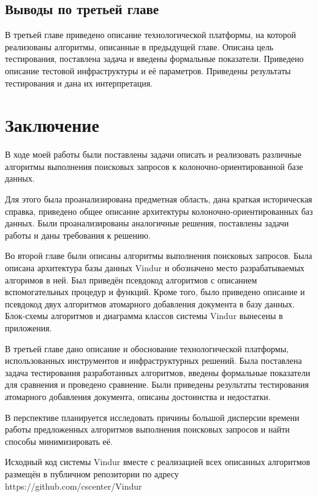 \documentclass{matmex-diploma}
\begin{document}
        \subsection{Выводы по третьей главе}
            В третьей главе приведено описание технологической платформы, на которой реализованы алгоритмы, описанные в предыдущей главе. Описана цель тестирования, поставлена задача и введены формальные показатели. Приведено описание тестовой инфраструктуры и её параметров. Приведены результаты тестирования и дана их интерпретация. 
    
\section*{Заключение}
    В ходе моей работы были поставлены задачи описать и реализовать различные алгоритмы выполнения поисковых запросов к колоночно-ориентированной базе данных. %
    
    Для этого была проанализирована предметная область, дана краткая историческая справка, приведено общее описание архитектуры колоночно-ориентированных баз данных. Были проанализированы аналогичные решения, поставлены задачи работы и даны требования к решению.
    
    Во второй главе были описаны алгоритмы выполнения поисковых запросов. Была описана архитектура базы данных Vindur и обозначено место разрабатываемых алгоримов в ней. Был приведён псевдокод алгоритмов с описанием вспомогательных процедур и функций. Кроме того, было приведено описание и псевдокод двух алгоритмов атомарного добавления документа в базу данных. Блок-схемы алгоритмов и диаграмма классов системы Vindur вынесены в приложения.
    
    В третьей главе дано описание и обоснование технологической платформы, использованных инструментов и инфраструктурных решений. Была поставлена задача тестирования разработанных алгоритмов, введены формальные показатели для сравнения и проведено сравнение. Были приведены результаты тестирования атомарного добавления документа, описаны достоинства и недостатки.
    
    В перспективе планируется исследовать причины большой дисперсии времени работы предложенных алгоритмов выполнения поисковых запросов и найти способы минимизировать её. 
    
    Исходный код системы Vindur вместе с реализацией всех описанных алгоритмов размещён в публичном репозитории по адресу https://github.com/cscenter/Vindur
    
\end{document}
